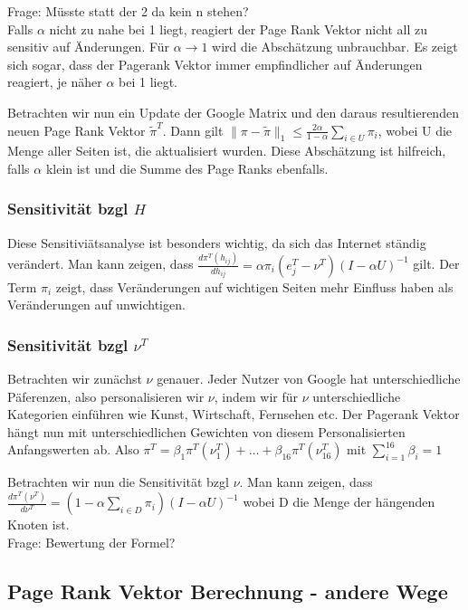 \documentclass[]{article}
\begin{document}
Frage: Müsste statt der 2 da kein n stehen? \\

Falls $\alpha$ nicht zu nahe bei 1 liegt, reagiert der Page Rank Vektor nicht all zu sensitiv auf Änderungen. Für $\alpha \rightarrow 1$ wird die Abschätzung unbrauchbar. Es zeigt sich sogar, dass der Pagerank Vektor immer empfindlicher auf Änderungen reagiert, je näher $\alpha$ bei 1 liegt. 

Betrachten wir nun ein Update der Google Matrix und den daraus resultierenden neuen Page Rank Vektor $\tilde{\pi}^T$. Dann gilt $\| \pi - \tilde{\pi}\|_1 \le \frac{2 \alpha}{1 - \alpha } \sum\limits_{i \in U} \pi_i$, wobei U die Menge aller Seiten ist, die aktualisiert wurden. Diese Abschätzung ist hilfreich, falls $\alpha$ klein ist und die Summe des Page Ranks ebenfalls.  

\subsubsection*{Sensitivität bzgl $H$}
Diese Sensitiviätsanalyse ist besonders wichtig, da sich das Internet ständig verändert. Man kann zeigen, dass $\frac{d \pi^T(h_{ij})}{d h_{ij}}= \alpha \pi_i (e_j^T-\nu^T)(I-\alpha U)^{-1}$ gilt. Der Term $\pi_i$ zeigt, dass Veränderungen auf wichtigen Seiten mehr Einfluss haben als Veränderungen auf unwichtigen. 

\subsubsection*{Sensitivität bzgl $\nu^T$}

Betrachten wir zunächst $\nu$ genauer. Jeder Nutzer von Google hat unterschiedliche Päferenzen, also personalisieren wir $\nu$, indem wir für $\nu$ unterschiedliche Kategorien einführen wie Kunst, Wirtschaft, Fernsehen etc. Der Pagerank Vektor hängt nun mit unterschiedlichen Gewichten von diesem Personalisierten Anfangswerten ab. Also $\pi^T = \beta_1 \pi^T(\nu_1^T) + \dots  + \beta_{16} \pi^T(\nu_{16}^T)$ mit $\sum_{i=1}^{16}\beta_i = 1$

Betrachten wir nun die Sensitivität bzgl $\nu$. Man kann zeigen, dass $\frac{d \pi^T(\nu^T)}{d \nu^T}= \left( 1 - \alpha \sum_{i \in D} \pi_i \right) (I - \alpha U)^{-1}$ wobei D die Menge der hängenden Knoten ist. \\

Frage: Bewertung der Formel? 
 

\subsection{Page Rank Vektor Berechnung - andere Wege}
\end{document}
